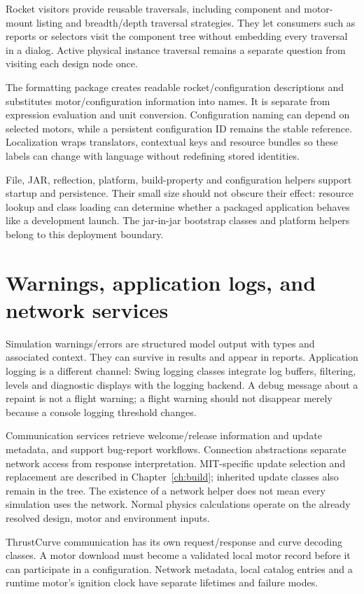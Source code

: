 Rocket visitors provide reusable traversals, including component and motor-mount listing and breadth/depth traversal strategies. They let consumers such as reports or selectors visit the component tree without embedding every traversal in a dialog. Active physical instance traversal remains a separate question from visiting each design node once.

The formatting package creates readable rocket/configuration descriptions and substitutes motor/configuration information into names. It is separate from expression evaluation and unit conversion. Configuration naming can depend on selected motors, while a persistent configuration ID remains the stable reference. Localization wraps translators, contextual keys and resource bundles so these labels can change with language without redefining stored identities.

File, JAR, reflection, platform, build-property and configuration helpers support startup and persistence. Their small size should not obscure their effect: resource lookup and class loading can determine whether a packaged application behaves like a development launch. The jar-in-jar bootstrap classes and platform helpers belong to this deployment boundary.

\section{Warnings, application logs, and network services}
Simulation warnings/errors are structured model output with types and associated context. They can survive in results and appear in reports. Application logging is a different channel: Swing logging classes integrate log buffers, filtering, levels and diagnostic displays with the logging backend. A debug message about a repaint is not a flight warning; a flight warning should not disappear merely because a console logging threshold changes.

Communication services retrieve welcome/release information and update metadata, and support bug-report workflows. Connection abstractions separate network access from response interpretation. MIT-specific update selection and replacement are described in Chapter~\ref{ch:build}; inherited update classes also remain in the tree. The existence of a network helper does not mean every simulation uses the network. Normal physics calculations operate on the already resolved design, motor and environment inputs.

ThrustCurve communication has its own request/response and curve decoding classes. A motor download must become a validated local motor record before it can participate in a configuration. Network metadata, local catalog entries and a runtime motor's ignition clock have separate lifetimes and failure modes.

